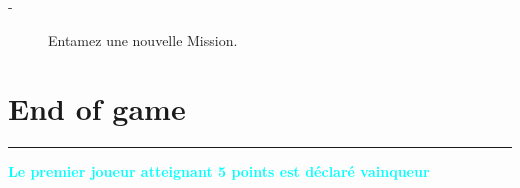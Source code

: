 \documentclass{article}%
\begin{document}
\begin{description}%
\item[{-} ]%
%
 Entamez une nouvelle Mission.
%
\end{description}

%
\sectionfont{\color{cyan}}%
\subsectionfont{\color{cyan}}%
\subsubsectionfont{\color{cyan}}%
\section{ End of game
}%
\label{sec:Endofgame}%
\textcolor{cyan}{\rule{18cm}{0.07cm}}\break%
\textcolor{cyan}{%
\textbf{Le premier joueur atteignant 5 points est déclaré vainqueur}%
}

%
\end{document}
